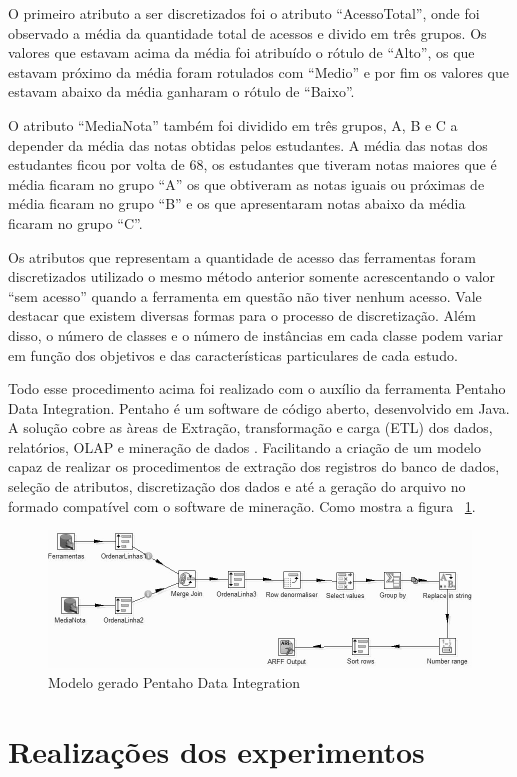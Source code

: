 \documentclass[12pt]{article}
\begin{document}
O primeiro atributo a ser discretizados foi o atributo ``AcessoTotal'', onde foi observado a média da quantidade total de acessos e divido em três grupos. Os valores que estavam acima da média foi atribuído o rótulo de ``Alto'', os que estavam próximo da média foram rotulados com ``Medio'' e por fim os valores que estavam abaixo da média ganharam o rótulo de ``Baixo''.

O atributo ``MediaNota'' também foi dividido em três grupos, A, B e C a depender da média das notas obtidas pelos estudantes. A média das notas dos estudantes ficou por volta de 68, os estudantes que tiveram notas maiores que é média ficaram no grupo ``A'' os que obtiveram as notas iguais ou próximas de média ficaram no grupo ``B'' e os que apresentaram notas abaixo da média ficaram no grupo ``C''. 

Os atributos que representam a quantidade de acesso das ferramentas foram discretizados utilizado o mesmo método anterior somente acrescentando o valor ``sem acesso'' quando a ferramenta em questão não tiver nenhum acesso. Vale destacar que existem diversas formas para o processo de discretização. Além disso, o número de classes e o número de instâncias em cada classe podem variar em função dos objetivos e das características particulares de cada estudo. 

Todo esse procedimento acima foi realizado com o auxílio da ferramenta Pentaho Data Integration. Pentaho é um software de código aberto, desenvolvido em Java. A solução cobre as àreas de Extração, transformação e carga (ETL) dos dados, relatórios, OLAP e mineração de dados \cite{Pentaho:2014}. Facilitando a criação de um modelo capaz de realizar os procedimentos de extração dos registros do banco de dados, seleção de atributos, discretização dos dados e até a geração do arquivo no formado compatível com o software de mineração. Como mostra a figura ~\ref{fig:Pentaho}. 
\begin{figure}[ht]
\centering
\includegraphics[width=.5\textwidth]{Pentaho.jpg}
\caption{Modelo gerado Pentaho Data Integration}
\label{fig:Pentaho}
\end{figure}

\section{Realizações dos experimentos}
\end{document}

